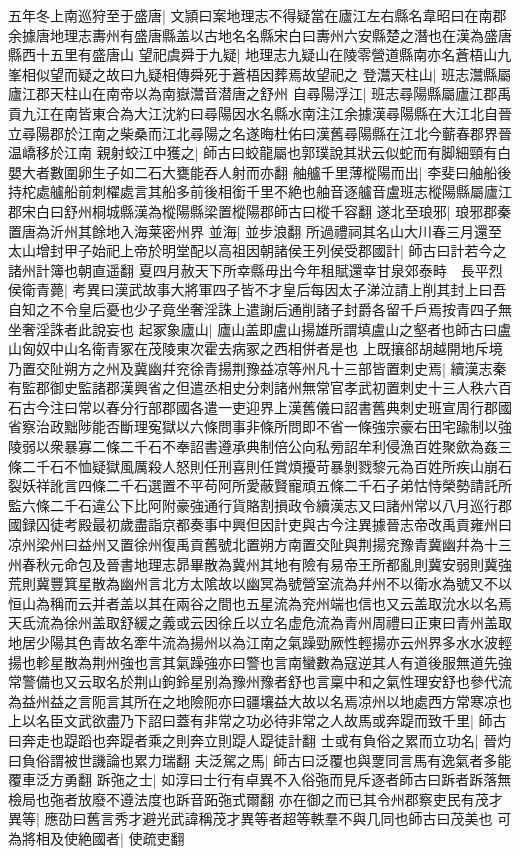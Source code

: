 五年冬上南巡狩至于盛唐|{
	文頴曰案地理志不得疑當在廬江左右縣名韋昭曰在南郡余據唐地理志夀州有盛唐縣盖以古地名名縣宋白曰夀州六安縣楚之潛也在漢為盛唐縣西十五里有盛唐山}
望祀虞舜于九疑|{
	地理志九疑山在陵零營道縣南亦名蒼梧山九峯相似望而疑之故曰九疑相傳舜死于蒼梧因葬焉故望祀之}
登灊天柱山|{
	班志灊縣屬廬江郡天柱山在南帝以為南嶽灊音潜唐之舒州}
自尋陽浮江|{
	班志尋陽縣屬廬江郡禹貢九江在南皆東合為大江沈約曰尋陽因水名縣水南注江余據漢尋陽縣在大江北自晉立尋陽郡於江南之柴桑而江北尋陽之名遂晦杜佑曰漢舊尋陽縣在江北今蘄春郡界晉温嶠移於江南}
親射蛟江中獲之|{
	師古曰蛟龍屬也郭璞說其狀云似蛇而有脚細頸有白嬰大者數圍卵生子如二石大甕能吞人射而亦翻}
舳艫千里薄樅陽而出|{
	李斐曰舳船後持柁處艫船前刺櫂處言其船多前後相銜千里不絶也舳音逐艫音盧班志樅陽縣屬廬江郡宋白曰舒州桐城縣漢為樅陽縣梁置樅陽郡師古曰樅千容翻}
遂北至琅邪|{
	琅邪郡秦置唐為沂州其餘地入海莱密州界}
並海|{
	並步浪翻}
所過禮祠其名山大川春三月還至太山增封甲子始祀上帝於明堂配以高祖因朝諸侯王列侯受郡國計|{
	師古曰計若今之諸州計簿也朝直遥翻}
夏四月赦天下所幸縣毋出今年租賦還幸甘泉郊泰畤　長平烈侯衛青薨|{
	考異曰漢武故事大將軍四子皆不才皇后每因太子涕泣請上削其封上曰吾自知之不令皇后憂也少子竟坐奢淫誅上遣謝后通削諸子封爵各留千戶焉按青四子無坐奢淫誅者此說妄也}
起冢象廬山|{
	廬山盖即盧山揚雄所謂填盧山之壑者也師古曰盧山匈奴中山名衛青冢在茂陵東次霍去病冢之西相併者是也}
上既攘郤胡越開地斥境乃置交阯朔方之州及冀幽幷兖徐青揚荆豫益凉等州凡十三部皆置刺史焉|{
	續漢志秦有監郡御史監諸郡漢興省之但遣丞相史分刺諸州無常官孝武初置刺史十三人秩六百石古今注曰常以春分行部郡國各遣一吏迎界上漢舊儀曰詔書舊典刺史班宣周行郡國省察治政黜陟能否斷理寃獄以六條問事非條所問即不省一條強宗豪右田宅踰制以強陵弱以衆暴寡二條二千石不奉詔書遵承典制倍公向私㫄詔牟利侵漁百姓聚歛為姦三條二千石不恤疑獄風厲殺人怒則任刑喜則任賞煩擾苛暴剝戮黎元為百姓所疾山崩石裂妖祥訛言四條二千石選置不平苟阿所愛蔽賢寵頑五條二千石子弟怙恃榮勢請託所監六條二千石違公下比阿附豪強通行貨賂割損政令續漢志又曰諸州常以八月巡行郡國録囚徒考殿最初歲盡詣京都奏事中興但因計吏與古今注異據晉志帝改禹貢雍州曰凉州梁州曰益州又置徐州復禹貢舊號北置朔方南置交阯與荆揚兖豫青冀幽幷為十三州春秋元命包及晉書地理志昴畢散為冀州其地有險有易帝王所都亂則冀安弱則冀強荒則冀豐箕星散為幽州言北方太隂故以幽冥為號營室流為幷州不以衛水為號又不以恒山為稱而云并者盖以其在兩谷之間也五星流為兖州端也信也又云盖取沇水以名焉天氐流為徐州盖取舒緩之義或云因徐丘以立名虚危流為青州周禮曰正東曰青州盖取地居少陽其色青故名牽牛流為揚州以為江南之氣躁勁厥性輕揚亦云州界多水水波輕揚也軫星散為荆州強也言其氣躁強亦曰警也言南蠻數為寇逆其人有道後服無道先強常警備也又云取名於荆山鉤鈴星别為豫州豫者舒也言稟中和之氣性理安舒也參代流為益州益之言阨言其所在之地險阨亦曰疆壤益大故以名焉凉州以地處西方常寒凉也}
上以名臣文武欲盡乃下詔曰蓋有非常之功必待非常之人故馬或奔踶而致千里|{
	師古曰奔走也踶蹈也奔踶者乘之則奔立則踶人踶徒計翻}
士或有負俗之累而立功名|{
	晉灼曰負俗謂被世譏論也累力瑞翻}
夫泛駕之馬|{
	師古曰泛覆也與覂同言馬有逸氣者多能覆車泛方勇翻}
跅㢮之士|{
	如淳曰士行有卓異不入俗㢮而見斥逐者師古曰跅者跅落無檢局也㢮者放廢不遵法度也跅音跖㢮式爾翻}
亦在御之而已其令州郡察吏民有茂才異等|{
	應劭曰舊言秀才避光武諱稱茂才異等者超等軼羣不與几同也師古曰茂美也}
可為將相及使絶國者|{
	使疏吏翻}


